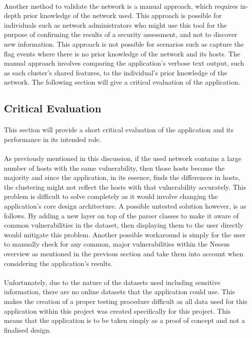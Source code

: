 \paragraph{}Another method to validate the network is a manual approach, which requires in-depth prior knowledge of the network used. This approach is possible for individuals such as network administrators who might use this tool for the purpose of confirming the results of a security assessment, and not to discover new information. This approach is not possible for scenarios such as capture the flag events where there is no prior knowledge of the network and its hosts. The manual approach involves comparing the application’s verbose text output, such as each cluster’s shared features, to the individual’s prior knowledge of the network. The following section will give a critical evaluation of the application.

\subsection{Critical Evaluation}
\label{criteval}
\paragraph{}This section will provide a short critical evaluation of the application and its performance in its intended role.

\paragraph{}As previously mentioned in this discussion, if the used network contains a large number of hosts with the same vulnerability, then those hosts become the majority and since the application, in its essence, finds the differences in hosts, the clustering might not reflect the hosts with that vulnerability accurately. This problem is difficult to solve completely as it would involve changing the application’s core design architecture. A possible untested solution however, is as follows. By adding a new layer on top of the parser classes to make it aware of common vulnerabilities in the dataset, then displaying them to the user directly would mitigate this problem. Another possible workaround is simply for the user to manually check for any common, major vulnerabilities within the Nessus overview as mentioned in the previous section and take them into account when considering the application’s results.

\paragraph{}Unfortunately, due to the nature of the datasets used including sensitive information, there are no online datasets that the application could use. This makes the creation of a proper testing procedure difficult as all data used for this application within this project was created specifically for this project. This means that the application is to be taken simply as a proof of concept and not a finalised design.

